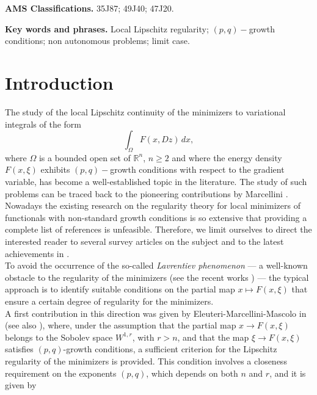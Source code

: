 \documentclass[12pt]{amsart}
\theoremstyle{definition}
\numberwithin{equation}{section}
\numberwithin{equation}{section}
\begin{document}
\noindent
{\footnotesize {\bf AMS Classifications.}  35J87; 49J40; 47J20.}

\noindent
{\footnotesize {\bf Key words and phrases.}  Local Lipschitz regularity; $(p,q)-$growth conditions; non autonomous problems; limit case.} 

\bigskip



\section{Introduction}

{The study of the local Lipschitz continuity of the minimizers to variational  integrals of the form
 \begin{equation}
\label{functional}
 \int_\Omega F(x, Dz)\,dx,
\end{equation}
where $\Omega$ is a bounded open set of $\mathbb{R}^n$, $n \ge 2$ and where the energy density $F(x,\xi)$ exhibits $(p,q)-$growth conditions with respect to the gradient variable, has become a well-established topic in the literature. The study of such problems can be traced back to the pioneering contributions by Marcellini \cite{M89, M91}. Nowadays the existing research on the regularity theory for local minimizers of functionals with non-standard growth conditions is so extensive that providing a complete list of references is unfeasible. Therefore, we limit ourselves to direct the interested reader to several survey articles on the subject \cite{Mar21, M06, Mingione-Radulescu} and to the latest achievements in \cite{CMMP2023, CMMEng, CMM04, CMMpress,  EMM2022, Mar23, moscariello-pascale,moscariello-pascale2}.
\\
To avoid the occurrence of the so-called {\it Lavrentiev phenomenon} — a well-known obstacle to the regularity of the minimizers (see  the recent works \cite{BDS, FDFL}) — the typical approach  is to identify suitable conditions on the partial map $x \mapsto F(x, \xi)$ that ensure a certain degree of regularity for the minimizers.
\\
A first contribution in this direction was given by Eleuteri-Marcellini-Mascolo in \cite{EMM16} (see also \cite{EMM3}), where, under the assumption that the partial map $x \to F(x,\xi)$ belongs to the Sobolev space $W^{1,r}$, with $r > n$, and that the map $\xi \to F(x,\xi)$ satisfies $(p,q)$-growth conditions, a sufficient criterion for the Lipschitz regularity of the minimizers is provided. This condition involves a closeness  requirement on the exponents $(p,q)$, which depends on both $n$ and $r$, and it is given by
}
\end{document}
